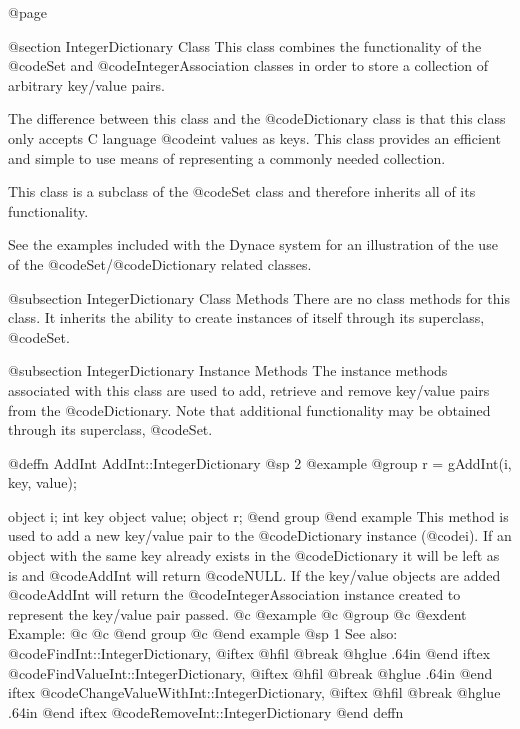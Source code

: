@page

@section IntegerDictionary Class
This class combines the functionality of the @code{Set}
and @code{IntegerAssociation} classes in order to store a collection of
arbitrary key/value pairs.

The difference between this class and the @code{Dictionary} class is
that this class only accepts C language @code{int} values as keys.
This class provides an efficient and simple to use means of representing
a commonly needed collection.

This class is a subclass of the @code{Set} class and therefore inherits
all of its functionality.

See the examples included with the Dynace system for an illustration of the
use of the @code{Set}/@code{Dictionary} related classes.


@subsection IntegerDictionary Class Methods
There are no class methods for this class.  It inherits the ability
to create instances of itself through its superclass, @code{Set}.



@subsection IntegerDictionary Instance Methods
The instance methods associated with this class are used to add, retrieve
and remove key/value pairs from the @code{Dictionary}.  Note that additional
functionality may be obtained through its superclass, @code{Set}.






@deffn {AddInt} AddInt::IntegerDictionary
@sp 2
@example
@group
r = gAddInt(i, key, value);

object  i;
int     key
object  value;
object  r;
@end group
@end example
This method is used to add a new key/value pair to the @code{Dictionary}
instance (@code{i}).  If an object with the same key already exists in
the @code{Dictionary} it will be left as is and @code{AddInt} will return
@code{NULL}.  If the key/value objects are added @code{AddInt} will
return the @code{IntegerAssociation} instance created to represent the
key/value pair passed.
@c @example
@c @group
@c @exdent Example:
@c 
@c @end group
@c @end example
@sp 1
See also:  @code{FindInt::IntegerDictionary,}
@iftex
@hfil @break @hglue .64in      
@end iftex
@code{FindValueInt::IntegerDictionary,}
@iftex
@hfil @break @hglue .64in      
@end iftex
@code{ChangeValueWithInt::IntegerDictionary,}
@iftex
@hfil @break @hglue .64in      
@end iftex
@code{RemoveInt::IntegerDictionary}
@end deffn











